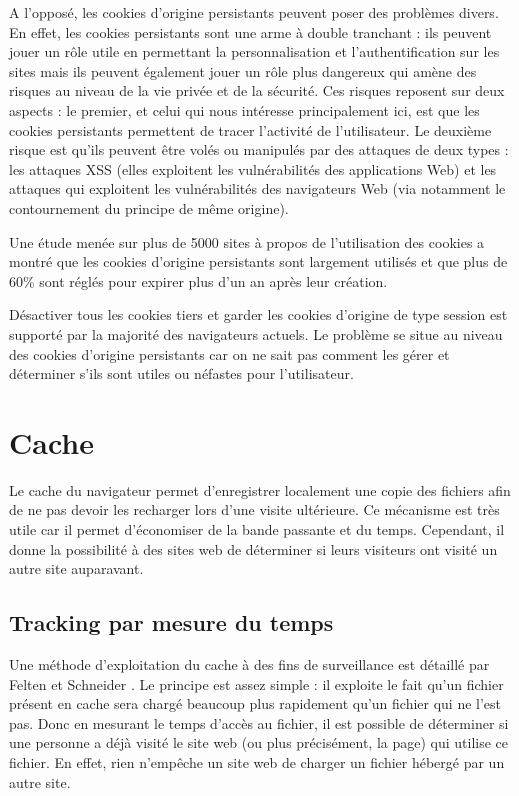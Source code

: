 A l'opposé, les cookies d'origine persistants peuvent poser des problèmes divers. En effet, les cookies persistants sont une arme à double tranchant : ils peuvent jouer un rôle utile en permettant la personnalisation et l'authentification sur les sites mais ils peuvent également jouer un rôle plus dangereux qui amène des risques au niveau de la vie privée et de la sécurité. Ces risques reposent sur deux aspects : le premier, et celui qui nous intéresse principalement ici, est que les cookies persistants permettent de tracer l'activité de l'utilisateur. Le deuxième risque est qu'ils peuvent être volés ou manipulés par des attaques de deux types : les attaques XSS (elles exploitent les vulnérabilités des applications Web) et les attaques qui exploitent les vulnérabilités des navigateurs Web (via notamment le contournement du principe de même origine).
\newline

Une étude menée sur plus de 5000 sites à propos de l'utilisation des cookies \cite{Yue:2007:ACU:1251984.1253093} a montré que les cookies d'origine persistants sont largement utilisés et que plus de 60\% sont réglés pour expirer plus d'un an après leur création.
\newline

Désactiver tous les cookies tiers et garder les cookies d'origine de type session est supporté par la majorité des navigateurs actuels. Le problème se situe au niveau des cookies d'origine persistants car on ne sait pas comment les gérer et déterminer s'ils sont utiles ou néfastes pour l'utilisateur.


\section{Cache}
\label{cache}
Le cache du navigateur permet d'enregistrer localement une copie des fichiers afin de ne pas devoir les recharger lors d'une visite ultérieure. Ce mécanisme est très utile car il permet d'économiser de la bande passante et du temps. Cependant, il donne la possibilité à des sites web de déterminer si leurs visiteurs ont visité un autre site auparavant.

\subsection{Tracking par mesure du temps}
Une méthode d'exploitation du cache à des fins de surveillance est détaillé par Felten et Schneider \cite{Felten:2000:TAW:352600.352606}.
Le principe est assez simple : il exploite le fait qu'un fichier présent en cache sera chargé beaucoup plus rapidement qu'un fichier qui ne l'est pas. Donc en mesurant le temps d'accès au fichier, il est possible de déterminer si une personne a déjà visité le site web (ou plus précisément, la page) qui utilise ce fichier. En effet, rien n'empêche un site web de charger un fichier hébergé par un autre site.
\newline

